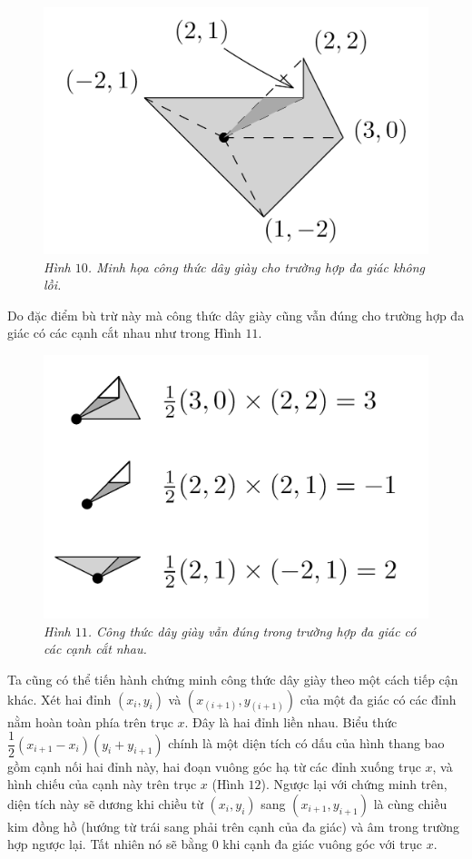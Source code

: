 \begin{multicols}{2}
\begin{figure}[H]
		\includegraphics[width= 1\linewidth]{14}
		\caption{\small\textit{\color{toanhocdoisong}Hình $10$. Minh họa công thức dây giày cho trường hợp đa giác không lồi.}}
		\vspace*{-10pt}
	\end{figure}
	Do đặc điểm bù trừ này mà công thức dây giày cũng vẫn đúng cho trường hợp đa giác có các cạnh cắt nhau như trong Hình $11$.
	\begin{figure}[H]
		\vspace*{-5pt}
		\centering
		\captionsetup{labelformat= empty, justification=centering}
		\includegraphics[width= 1\linewidth]{15}
		\caption{\small\textit{\color{toanhocdoisong}Hình $11$. Công thức dây giày vẫn đúng trong trường hợp đa giác có các cạnh cắt nhau.}}
		\vspace*{-10pt}
	\end{figure}
	Ta cũng có thể tiến hành chứng minh công thức dây giày theo một cách tiếp cận khác. Xét hai đỉnh $(x_i,y_i)$ và $(x_(i+1),y_(i+1))$ của một đa giác có các đỉnh nằm hoàn toàn phía trên trục $x$. Đây là hai đỉnh liền nhau. Biểu thức  $\dfrac{1}{2}(x_{i+1}-x_i)(y_i+y_{i+1})$ chính là một diện tích có dấu của hình thang bao gồm cạnh nối hai đỉnh này, hai đoạn vuông góc hạ từ các đỉnh xuống trục $x$, và hình chiếu của cạnh này trên trục $x$ (Hình $12$). Ngược lại với chứng minh trên, diện tích này sẽ dương khi chiều từ $(x_i,y_i)$ sang $(x_{i+1},y_{i+1})$ là cùng chiều kim đồng hồ (hướng từ trái sang phải trên cạnh của đa giác) và âm trong trường hợp ngược lại. Tất nhiên nó sẽ bằng $0$ khi cạnh đa giác vuông góc với trục $x$.

\end{multicols}
